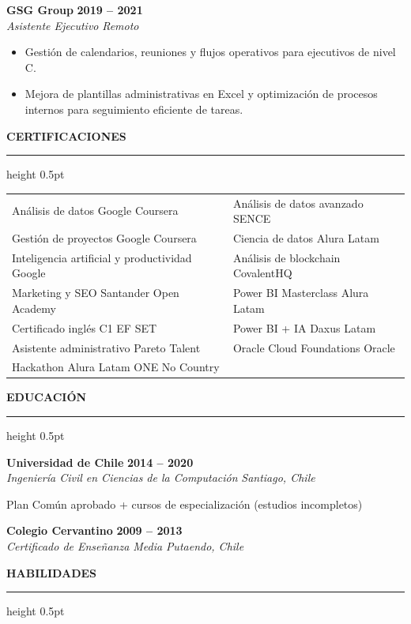\documentclass[12pt, a4paper]{article}
\newcommand{\seccion}[1]{%
  \vspace{7pt}%
  {\large\bfseries #1}%
  \vspace{1pt}%
  \hrule height 0.5pt%
  \vspace{2pt}%
}
\newcommand{\trabajo}[4]{%
  \noindent\textbf{#1} \hfill \textbf{#2}\\
  \textit{#3} \hfill \textit{#4}%
  \vspace{1pt}%
}
\newcommand{\edu}[4]{%
  \noindent\textbf{#1} \hfill \textbf{#2}\\
  \textit{#3} \hfill \textit{#4}%
  \vspace{1pt}%
}
\begin{document}
\trabajo{GSG Group}{2019 -- 2021}{Asistente Ejecutivo}{Remoto}
\begin{itemize}
  \item Gestión de calendarios, reuniones y flujos operativos para ejecutivos de nivel C.
  \item Mejora de plantillas administrativas en Excel y optimización de procesos
        internos para seguimiento eficiente de tareas.
\end{itemize}

\seccion{CERTIFICACIONES}

\begin{tabularx}{\textwidth}{@{} X X @{}}
  Análisis de datos \textbar{} Google Coursera            & Análisis de datos avanzado \textbar{} SENCE           \\[2pt]
  Gestión de proyectos \textbar{} Google Coursera          & Ciencia de datos \textbar{} Alura Latam               \\[2pt]
  Inteligencia artificial y productividad \textbar{} Google & Análisis de blockchain \textbar{} CovalentHQ         \\[2pt]
  Marketing y SEO \textbar{} Santander Open Academy        & Power BI Masterclass \textbar{} Alura Latam           \\[2pt]
  Certificado inglés C1 \textbar{} EF SET                  & Power BI + IA \textbar{} Daxus Latam                  \\[2pt]
  Asistente administrativo \textbar{} Pareto Talent        & Oracle Cloud Foundations \textbar{} Oracle            \\[2pt]
  Hackathon Alura Latam ONE \textbar{} No Country          &                                                       \\
\end{tabularx}

\seccion{EDUCACIÓN}

\edu{Universidad de Chile}{2014 -- 2020}%
    {Ingeniería Civil en Ciencias de la Computación}{Santiago, Chile}

\noindent\small Plan Común aprobado + cursos de especialización (estudios incompletos)
\vspace{4pt}

\edu{Colegio Cervantino}{2009 -- 2013}%
    {Certificado de Enseñanza Media}{Putaendo, Chile}

\seccion{HABILIDADES}
\end{document}
